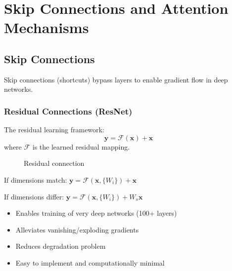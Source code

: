 %

\clearpage
\cleardoublepage

\chapter{Skip Connections and Attention Mechanisms}

\section{Skip Connections}

Skip connections (shortcuts) bypass layers to enable gradient flow in deep networks.

\subsection{Residual Connections (ResNet)}

The residual learning framework:
\begin{equation}
\mathbf{y} = \mathcal{F}(\mathbf{x}) + \mathbf{x}
\end{equation}
where $\mathcal{F}$ is the learned residual mapping.

\begin{figure}[h]
    \centering
    \caption{Residual connection}
    \label{fig:residual}
\end{figure}

If dimensions match: $\mathbf{y} = \mathcal{F}(\mathbf{x}, \{W_i\}) + \mathbf{x}$

If dimensions differ: $\mathbf{y} = \mathcal{F}(\mathbf{x}, \{W_i\}) + W_s\mathbf{x}$

\begin{properties}
\begin{itemize}
    \item Enables training of very deep networks (100+ layers)
    \item Alleviates vanishing/exploding gradients
    \item Reduces degradation problem
    \item Easy to implement and computationally minimal
\end{itemize}
\end{properties}

